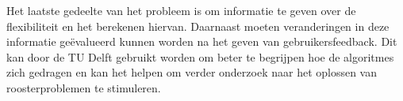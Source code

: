 Het laatste gedeelte van het probleem is om informatie te geven over de flexibiliteit en het berekenen hiervan. Daarnaast moeten veranderingen in deze informatie ge\"evalueerd kunnen worden na het geven van gebruikersfeedback. Dit kan door de TU Delft gebruikt worden om beter te begrijpen hoe de algoritmes zich gedragen en kan het helpen om verder onderzoek naar het oplossen van roosterproblemen te stimuleren.

